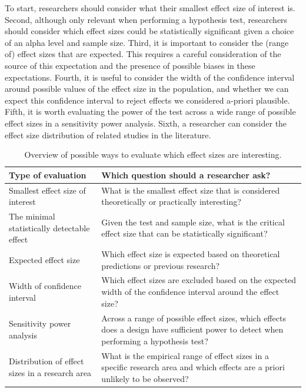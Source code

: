 \documentclass[
  oneside]{book}
\begin{document}
To start, researchers should consider what their smallest effect size of interest is. Second, although only relevant when performing a hypothesis test, researchers should consider which effect sizes could be statistically significant given a choice of an alpha level and sample size. Third, it is important to consider the (range of) effect sizes that are expected. This requires a careful consideration of the source of this expectation and the presence of possible biases in these expectations. Fourth, it is useful to consider the width of the confidence interval around possible values of the effect size in the population, and whether we can expect this confidence interval to reject effects we considered a-priori plausible. Fifth, it is worth evaluating the power of the test across a wide range of possible effect sizes in a sensitivity power analysis. Sixth, a researcher can consider the effect size distribution of related studies in the literature.

\begin{table}

\caption{\label{tab:table-effect-eval}Overview of possible ways to evaluate which effect sizes are interesting.}
\centering
\begin{tabular}[t]{l|l}
\hline
Type of evaluation & Which question should a researcher ask?\\
\hline
Smallest effect size of interest & What is the smallest effect size that is considered theoretically or practically interesting?\\
\hline
The minimal statistically detectable effect & Given the test and sample size, what is the critical effect size that can be statistically significant?\\
\hline
Expected effect size & Which effect size is expected based on theoretical predictions or previous research?\\
\hline
Width of confidence interval & Which effect sizes are excluded based on the expected width of the confidence interval around the effect size?\\
\hline
Sensitivity power analysis & Across a range of possible effect sizes, which effects does a design have sufficient power to detect when performing a hypothesis test?\\
\hline
Distribution of effect sizes in a research area & What is the empirical range of effect sizes in a specific research area and which effects are a priori unlikely to be observed?\\
\hline
\end{tabular}
\end{table}
\end{document}
